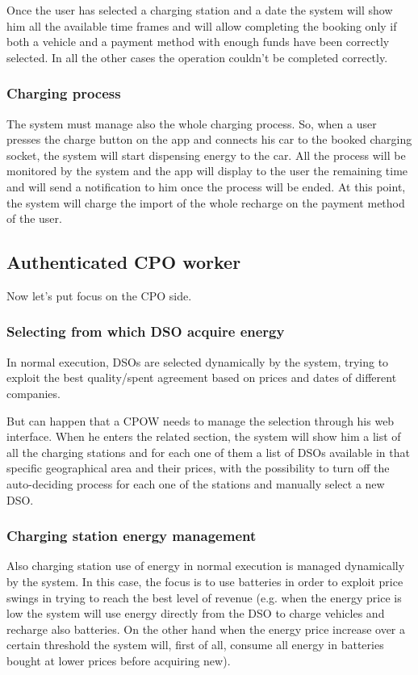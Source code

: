 \documentclass[a4paper]{report}
\begin{document}
Once the user has selected a charging station and a date the system will show him all the available time frames and will allow completing the booking only if both a vehicle and a payment method with enough funds have been correctly selected. In all the other cases the operation couldn't be completed correctly.

\subsubsection{Charging process}
The system must manage also the whole charging process. So, when a user presses the charge button on the app and connects his car to the booked charging socket, the system will start dispensing energy to the car. All the process will be monitored by the system and the app will display to the user the remaining time and will send a notification to him once the process will be ended. At this point, the system will charge the import of the whole recharge on the payment method of the user.

\subsection{Authenticated CPO worker}
Now let's put focus on the CPO side.
\subsubsection{Selecting from which DSO acquire energy}
In normal execution, DSOs are selected dynamically by the system, trying to exploit the best quality/spent agreement based on prices and dates of different companies.

But can happen that a CPOW needs to manage the selection through his web interface. When he enters the related section, the system will show him a list of all the charging stations and for each one of them a list of DSOs available in that specific geographical area and their prices, with the possibility to turn off the auto-deciding process for each one of the stations and manually select a new DSO.
\subsubsection{Charging station energy management}
Also charging station use of energy in normal execution is managed dynamically by the system. In this case, the focus is to use batteries in order to exploit price swings in trying to reach the best level of revenue (e.g. when the energy price is low the system will use energy directly from the DSO to charge vehicles and recharge also batteries. On the other hand when the energy price increase over a certain threshold the system will, first of all, consume all energy in batteries bought at lower prices before acquiring new).
\end{document}

